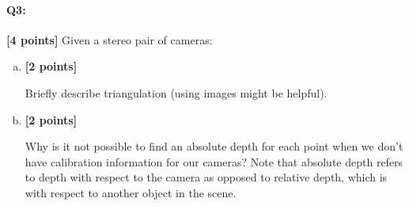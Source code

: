 \begin{enumerate}[(a)]



\pagebreak
\paragraph{Q3:} \textbf{[4 points]} Given a stereo pair of cameras:
\begin{enumerate} [(a)]
\item \textbf{[2 points]} 
\begin{tcolorbox}[colback=orange!5!white,colframe=orange!75!black]
Briefly describe triangulation (using images might be helpful).
\end{tcolorbox}


\item \textbf{[2 points]} 
\begin{tcolorbox}[colback=orange!5!white,colframe=orange!75!black]
Why is it not possible to find an absolute depth for each point when we don't have calibration information for our cameras? Note that absolute depth refers to depth with respect to the camera as opposed to relative depth, which is with respect to another object in the scene. 
\end{tcolorbox}

\end{enumerate}

\end{enumerate}

